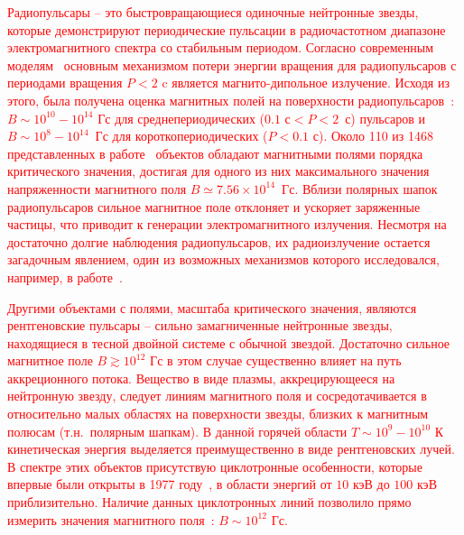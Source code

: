 \textcolor{red}{Радиопульсары -- это быстровращающиеся одиночные нейтронные звезды, которые демонстрируют периодические пульсации в радиочастотном диапазоне электромагнитного спектра со стабильным периодом. Согласно современным моделям~\cite{Gunn:1969,Pacini:1970} основным механизмом потери энергии вращения для радиопульсаров с периодами вращения $P<2$ c является магнито-дипольное излучение. Исходя из этого, была получена оценка магнитных полей на поверхности радиопульсаров~\cite{Kim:2023}: $B\sim 10^{10}-10^{14}$ Гс для среднепериодических ($0.1\text{ с}<P<2$~с) пульсаров и $B\sim10^8-10^{14}$~Гс для короткопериодических ($P<0.1$ с). Около 110 из 1468 представленных в работе~\cite{Kim:2023} объектов обладают магнитными полями порядка критического значения, достигая для одного из них максимального значения напряженности магнитного поля $B\simeq7.56 \times 10^{14}$~Гс. Вблизи полярных шапок радиопульсаров сильное магнитное поле отклоняет и ускоряет заряженные частицы, что приводит к генерации электромагнитного излучения.    Несмотря на достаточно долгие наблюдения радиопульсаров, их радиоизлучение остается загадочным явлением, один из возможных механизмов которого исследовался, например, в работе~\cite{Philippov_2020}.}
	
\textcolor{red}{Другими объектами с полями, масштаба критического значения, являются рентгеновские пульсары -- сильно замагниченные нейтронные звезды, находящиеся в тесной двойной системе с обычной звездой. Достаточно сильное магнитное поле $B\gtrsim10^{12}$ Гс в этом случае существенно влияет на путь аккреционного потока. Вещество в виде плазмы, аккрецирующееся на нейтронную звезду, следует линиям магнитного поля и сосредотачивается в относительно малых областях на поверхности звезды, близких к магнитным полюсам (т.н.~полярным шапкам). В данной горячей области $T\sim10^9-10^{10}$ К кинетическая энергия выделяется преимущественно в виде рентгеновских лучей. В спектре этих объектов присутствую циклотронные особенности, которые впервые были открыты в 1977 году~\cite{Trumper:1977}, в области энергий от $10$ кэВ до $100$ кэВ приблизительно. Наличие данных циклотронных линий позволило прямо измерить значения магнитного поля~\cite{Staubert:2019}: $B\sim10^{12}$ Гс.}
 

